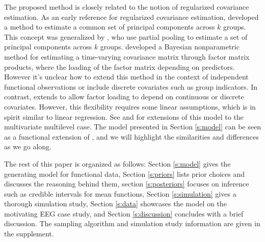 \documentclass[useAMS,referee,usenatbib]{biom}
\begin{document}
The proposed method is closely related to the notion of regularized covariance estimation. As an early reference for regularized covariance estimation, \citet{Flury1984} developed a method to estimate a common set of principal components across $k$ groups. This concept was generalized by \citet{Franks2019}, who use partial pooling to estimate a set of principal components across $k$ groups. \citet{Fox2015} developed a Bayesian nonparametric method for estimating a time-varying covariance matrix through factor matrix products, where the loading of the factor matrix depending on predictors. However it's unclear how to extend this method in the context of independent functional observations or include discrete covariates such as group indicators. In contrast, \citet{Hoff2012} extends to allow factor loading to depend on continuous or discrete covariates. However, this flexibility requires some linear assumptions, which is in spirit similar to linear regression. See \citet{Li2014} and \citet{Quintero2017} for extensions of this model to the multivariate multilevel case. The model presented in Section \ref{s:model} can be seen as a functional extension of \citet{Hoff2012}, and we will highlight the similarities and differences as we go along. 

The rest of this paper is organized as follows: Section \ref{s:model} gives the generating model for functional data, Section \ref{s:priors} lists prior choices and discusses the reasoning behind them, section \ref{s:posteriors} focuses on inference such as credible intervals for mean functions, Section \ref{s:simulation} gives a thorough simulation study, Section \ref{s:data} showcases the model on the motivating EEG case study, and Section \ref{s:discussion} concludes with a brief discussion. The sampling algorithm and  simulation study information are given in the supplement.
\end{document}
